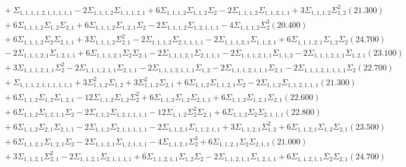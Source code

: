 \documentclass[12pt]{article}
\begin{document}
\begin{landscape}
\begin{align*}
		&\quad\quad +\Sigma_{1,1,1,1,2,1,1,1,1,1}-2\Sigma_{1,1,1,2}\Sigma_{1,1,1,2,1}+6\Sigma_{1,1,1,2}\Sigma_{1,1,2}\Sigma_{2}-2\Sigma_{1,1,1,2}\Sigma_{1,1,2,1,1}+3\Sigma_{1,1,1,2}\Sigma_{1,2}^{2}(21.300) \\ 
		&\quad\quad +6\Sigma_{1,1,1,2}\Sigma_{1,2}\Sigma_{2,1}+6\Sigma_{1,1,1,2}\Sigma_{1,2,1}\Sigma_{2}-2\Sigma_{1,1,1,2}\Sigma_{1,2,1,1,1}-4\Sigma_{1,1,1,2}\Sigma_{2}^{3}(20.400) \\ 
		&\quad\quad +6\Sigma_{1,1,1,2}\Sigma_{2}\Sigma_{2,1,1}+3\Sigma_{1,1,1,2}\Sigma_{2,1}^{2}-2\Sigma_{1,1,1,2}\Sigma_{2,1,1,1,1}-2\Sigma_{1,1,1,2,1}\Sigma_{1,1,2,1}+6\Sigma_{1,1,1,2,1}\Sigma_{1,2}\Sigma_{2}(24.700) \\ 
		&\quad\quad -2\Sigma_{1,1,1,2,1}\Sigma_{1,2,1,1}+6\Sigma_{1,1,1,2,1}\Sigma_{2}\Sigma_{2,1}-2\Sigma_{1,1,1,2,1}\Sigma_{2,1,1,1}-2\Sigma_{1,1,1,2,1,1}\Sigma_{1,1,2}-2\Sigma_{1,1,1,2,1,1}\Sigma_{1,2,1}(23.100) \\ 
		&\quad\quad +3\Sigma_{1,1,1,2,1,1}\Sigma_{2}^{2}-2\Sigma_{1,1,1,2,1,1}\Sigma_{2,1,1}-2\Sigma_{1,1,1,2,1,1,1}\Sigma_{1,2}-2\Sigma_{1,1,1,2,1,1,1}\Sigma_{2,1}-2\Sigma_{1,1,1,2,1,1,1,1}\Sigma_{2}(22.700) \\ 
		&\quad\quad +\Sigma_{1,1,1,2,1,1,1,1,1,1}+3\Sigma_{1,1,2}^{2}\Sigma_{1,2}+3\Sigma_{1,1,2}^{2}\Sigma_{2,1}+6\Sigma_{1,1,2}\Sigma_{1,1,2,1}\Sigma_{2}-2\Sigma_{1,1,2}\Sigma_{1,1,2,1,1,1}(21.300) \\ 
		&\quad\quad +6\Sigma_{1,1,2}\Sigma_{1,2}\Sigma_{1,2,1}-12\Sigma_{1,1,2}\Sigma_{1,2}\Sigma_{2}^{2}+6\Sigma_{1,1,2}\Sigma_{1,2}\Sigma_{2,1,1}+6\Sigma_{1,1,2}\Sigma_{1,2,1}\Sigma_{2,1}(22.600) \\ 
		&\quad\quad +6\Sigma_{1,1,2}\Sigma_{1,2,1,1}\Sigma_{2}-2\Sigma_{1,1,2}\Sigma_{1,2,1,1,1,1}-12\Sigma_{1,1,2}\Sigma_{2}^{2}\Sigma_{2,1}+6\Sigma_{1,1,2}\Sigma_{2}\Sigma_{2,1,1,1}(22.800) \\ 
		&\quad\quad +6\Sigma_{1,1,2}\Sigma_{2,1}\Sigma_{2,1,1}-2\Sigma_{1,1,2}\Sigma_{2,1,1,1,1,1}-2\Sigma_{1,1,2,1}\Sigma_{1,1,2,1,1}+3\Sigma_{1,1,2,1}\Sigma_{1,2}^{2}+6\Sigma_{1,1,2,1}\Sigma_{1,2}\Sigma_{2,1}(23.500) \\ 
		&\quad\quad +6\Sigma_{1,1,2,1}\Sigma_{1,2,1}\Sigma_{2}-2\Sigma_{1,1,2,1}\Sigma_{1,2,1,1,1}-4\Sigma_{1,1,2,1}\Sigma_{2}^{3}+6\Sigma_{1,1,2,1}\Sigma_{2}\Sigma_{2,1,1}(21.000) \\ 
		&\quad\quad +3\Sigma_{1,1,2,1}\Sigma_{2,1}^{2}-2\Sigma_{1,1,2,1}\Sigma_{2,1,1,1,1}+6\Sigma_{1,1,2,1,1}\Sigma_{1,2}\Sigma_{2}-2\Sigma_{1,1,2,1,1}\Sigma_{1,2,1,1}+6\Sigma_{1,1,2,1,1}\Sigma_{2}\Sigma_{2,1}(24.700) \\ 

\end{align*}
\end{landscape}
\end{document}
